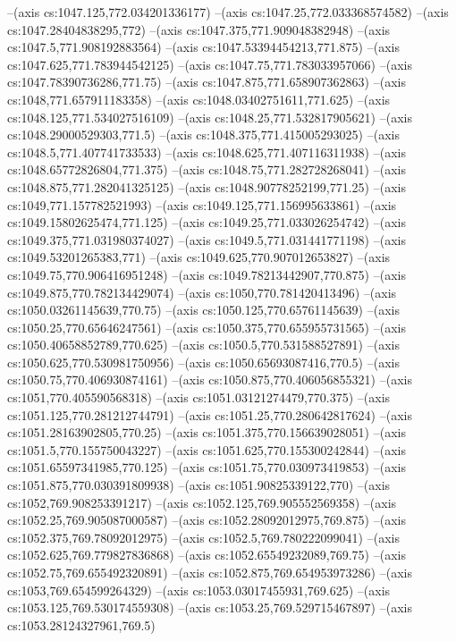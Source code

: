 --(axis cs:1047.125,772.034201336177)
--(axis cs:1047.25,772.033368574582)
--(axis cs:1047.28404838295,772)
--(axis cs:1047.375,771.909048382948)
--(axis cs:1047.5,771.908192883564)
--(axis cs:1047.53394454213,771.875)
--(axis cs:1047.625,771.783944542125)
--(axis cs:1047.75,771.783033957066)
--(axis cs:1047.78390736286,771.75)
--(axis cs:1047.875,771.658907362863)
--(axis cs:1048,771.657911183358)
--(axis cs:1048.03402751611,771.625)
--(axis cs:1048.125,771.534027516109)
--(axis cs:1048.25,771.532817905621)
--(axis cs:1048.29000529303,771.5)
--(axis cs:1048.375,771.415005293025)
--(axis cs:1048.5,771.407741733533)
--(axis cs:1048.625,771.407116311938)
--(axis cs:1048.65772826804,771.375)
--(axis cs:1048.75,771.282728268041)
--(axis cs:1048.875,771.282041325125)
--(axis cs:1048.90778252199,771.25)
--(axis cs:1049,771.157782521993)
--(axis cs:1049.125,771.156995633861)
--(axis cs:1049.15802625474,771.125)
--(axis cs:1049.25,771.033026254742)
--(axis cs:1049.375,771.031980374027)
--(axis cs:1049.5,771.031441771198)
--(axis cs:1049.53201265383,771)
--(axis cs:1049.625,770.907012653827)
--(axis cs:1049.75,770.906416951248)
--(axis cs:1049.78213442907,770.875)
--(axis cs:1049.875,770.782134429074)
--(axis cs:1050,770.781420413496)
--(axis cs:1050.03261145639,770.75)
--(axis cs:1050.125,770.65761145639)
--(axis cs:1050.25,770.65646247561)
--(axis cs:1050.375,770.655955731565)
--(axis cs:1050.40658852789,770.625)
--(axis cs:1050.5,770.531588527891)
--(axis cs:1050.625,770.530981750956)
--(axis cs:1050.65693087416,770.5)
--(axis cs:1050.75,770.406930874161)
--(axis cs:1050.875,770.406056855321)
--(axis cs:1051,770.405590568318)
--(axis cs:1051.03121274479,770.375)
--(axis cs:1051.125,770.281212744791)
--(axis cs:1051.25,770.280642817624)
--(axis cs:1051.28163902805,770.25)
--(axis cs:1051.375,770.156639028051)
--(axis cs:1051.5,770.155750043227)
--(axis cs:1051.625,770.155300242844)
--(axis cs:1051.65597341985,770.125)
--(axis cs:1051.75,770.030973419853)
--(axis cs:1051.875,770.030391809938)
--(axis cs:1051.90825339122,770)
--(axis cs:1052,769.908253391217)
--(axis cs:1052.125,769.905552569358)
--(axis cs:1052.25,769.905087000587)
--(axis cs:1052.28092012975,769.875)
--(axis cs:1052.375,769.78092012975)
--(axis cs:1052.5,769.780222099041)
--(axis cs:1052.625,769.779827836868)
--(axis cs:1052.65549232089,769.75)
--(axis cs:1052.75,769.655492320891)
--(axis cs:1052.875,769.654953973286)
--(axis cs:1053,769.654599264329)
--(axis cs:1053.03017455931,769.625)
--(axis cs:1053.125,769.530174559308)
--(axis cs:1053.25,769.529715467897)
--(axis cs:1053.28124327961,769.5)
